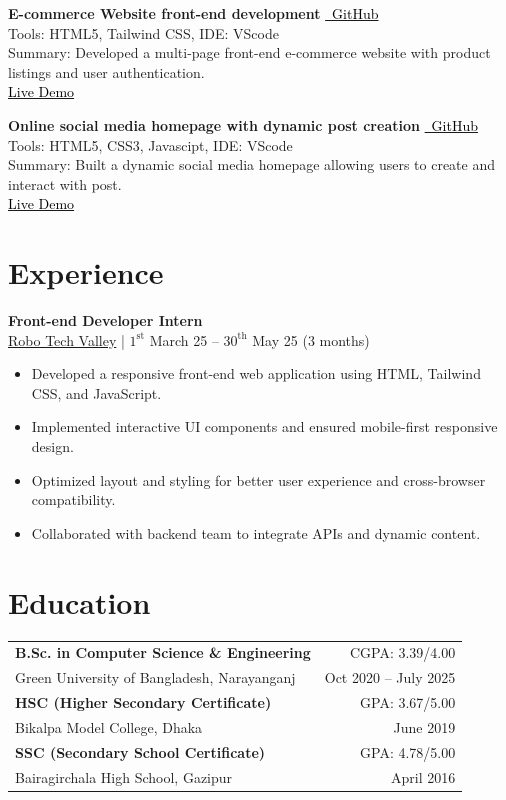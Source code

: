 \documentclass[a4paper,10pt]{article}
\newcommand{\githubbutton}[2]{%
  \colorbox{gray!20}{\href{#1}{\textcolor{black}{\faGithub\ #2}}}%
}
\newcommand{\cvsection}[2]{%
  \section*{\textcolor{blue!50!black}{#1}}\label{#2}%
  \vspace{4pt}%
}
\begin{document}
\vspace{4pt}
\textbf{E-commerce Website front-end development} 
\githubbutton{https://github.com/Nuzmolkhan/Online-Shopping-website-front-end-designing-using-html-tailwindcss}{GitHub} \\
Tools: HTML5, Tailwind CSS, IDE: VScode \\
Summary: Developed a multi-page front-end e-commerce website with product listings and user authentication. \\[2pt]
\colorbox{gray!20}{\href{https://nuzmolkhan.github.io/Online-Shopping-website-front-end-designing-using-html-tailwindcss/index.html}{\textcolor{black}{Live Demo}}}

\vspace{4pt}
\textbf{Online social media homepage with dynamic post creation} 
\githubbutton{https://github.com/Nuzmolkhan/Facebook-home-web-page-with-dynamic-post-creation}{GitHub} \\
Tools: HTML5, CSS3, Javascipt, IDE: VScode \\
Summary: Built a dynamic social media homepage allowing users to create and interact with post. \\[2pt]
\colorbox{gray!20}{\href{https://nuzmolkhan.github.io/Facebook-home-web-page-with-dynamic-post-creation/}{\textcolor{black}{Live Demo}}}

\cvsection{Experience}{sec:experience}

\textbf{Front-end Developer Intern} \\
\colorbox{gray!20}{\href{https://robotechvalley.com/}{Robo Tech Valley}} \; | \; $1^{\text{st}}$ March 25 -- $30^{\text{th}}$ May 25 (3 months) \\
\begin{itemize}
  \item Developed a responsive front-end web application using HTML, Tailwind CSS, and JavaScript.
  \item Implemented interactive UI components and ensured mobile-first responsive design.
  \item Optimized layout and styling for better user experience and cross-browser compatibility.
  \item Collaborated with backend team to integrate APIs and dynamic content.
\end{itemize}

\cvsection{Education}{sec:education}

\begin{tabular}{p{12cm} r}
\textbf{B.Sc. in Computer Science \& Engineering} & CGPA: 3.39/4.00 \\
Green University of Bangladesh, Narayanganj & Oct 2020 -- July 2025 \\[2mm]
\textbf{HSC (Higher Secondary Certificate)} & GPA: 3.67/5.00 \\
Bikalpa Model College, Dhaka & June 2019 \\[2mm]
\textbf{SSC (Secondary School Certificate)} & GPA: 4.78/5.00 \\
Bairagirchala High School, Gazipur & April 2016 \\
\end{tabular}
\end{document}
